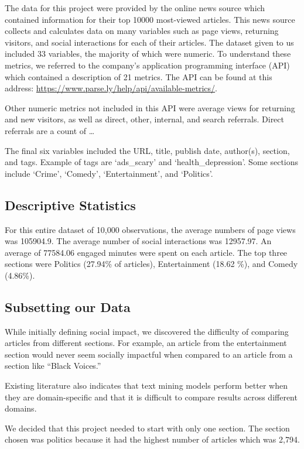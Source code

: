 \documentclass[10pt,letterpaper]{article}
\begin{document}
The data for this project were provided by the online news source which
contained information for their top 10000 most-viewed articles. This
news source collects and calculates data on many variables such as page
views, returning visitors, and social interactions for each of their
articles. The dataset given to us included 33 variables, the majority of
which were numeric. To understand these metrics, we referred to the
company's application programming interface (API) which contained a
description of 21 metrics. The API can be found at this address:
\url{https://www.parse.ly/help/api/available-metrics/}.

Other numeric metrics not included in this API were average views for
returning and new visitors, as well as direct, other, internal, and
search referrals. Direct referrals are a count of \ldots{}

The final six variables included the URL, title, publish date,
author(s), section, and tags. Example of tags are `ads\_scary' and
`health\_depression'. Some sections include `Crime', `Comedy',
`Entertainment', and `Politics'.

\subsection{Descriptive Statistics}\label{descriptive-statistics}

For this entire dataset of 10,000 observations, the average numbers of
page views was 105904.9. The average number of social interactions was
12957.97. An average of 77584.06 engaged minutes were spent on each
article. The top three sections were Politics (27.94\% of articles),
Entertainment (18.62 \%), and Comedy (4.86\%).

\subsection{Subsetting our Data}\label{subsetting-our-data}

While initially defining social impact, we discovered the difficulty of
comparing articles from different sections. For example, an article from
the entertainment section would never seem socially impactful when
compared to an article from a section like ``Black Voices.''

Existing literature also indicates that text mining models perform
better when they are domain-specific and that it is difficult to compare
results across different domains.

We decided that this project needed to start with only one section. The
section chosen was politics because it had the highest number of
articles which was 2,794.
\end{document}
